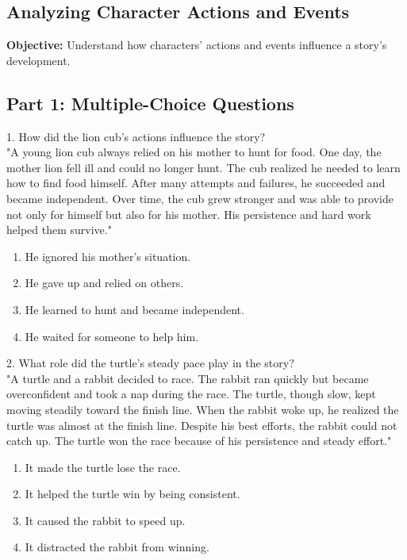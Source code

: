 \documentclass[12pt]{article}
\begin{document}
\subsection*{Analyzing Character Actions and Events}
\onehalfspacing

\begin{tcolorbox}[colframe=black!40, colback=gray!0, title=Learning Objective]
\textbf{Objective:} Understand how characters’ actions and events influence a story’s development.
\end{tcolorbox}

\subsection*{Part 1: Multiple-Choice Questions}

1. How did the lion cub’s actions influence the story? \\
"A young lion cub always relied on his mother to hunt for food. One day, the mother lion fell ill and could no longer hunt. The cub realized he needed to learn how to find food himself. After many attempts and failures, he succeeded and became independent. Over time, the cub grew stronger and was able to provide not only for himself but also for his mother. His persistence and hard work helped them survive."\\
\begin{enumerate}[label=\Alph*.]
    \item He ignored his mother’s situation.
    \item He gave up and relied on others.
    \item He learned to hunt and became independent.
    \item He waited for someone to help him.
\end{enumerate}

\vspace{1cm}

2. What role did the turtle’s steady pace play in the story?\\
"A turtle and a rabbit decided to race. The rabbit ran quickly but became overconfident and took a nap during the race. The turtle, though slow, kept moving steadily toward the finish line. When the rabbit woke up, he realized the turtle was almost at the finish line. Despite his best efforts, the rabbit could not catch up. The turtle won the race because of his persistence and steady effort."\\
\begin{enumerate}[label=\Alph*.]
    \item It made the turtle lose the race.
    \item It helped the turtle win by being consistent.
    \item It caused the rabbit to speed up.
    \item It distracted the rabbit from winning.
\end{enumerate}
\end{document}
